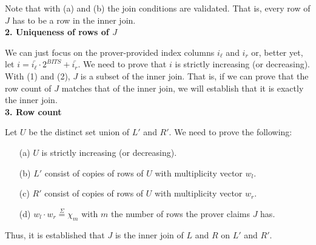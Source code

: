 \documentclass[11pt]{article}
\begin{document}
\noindent Note that with (a) and (b) the join conditions are validated. That is, every row of $J$ has to be a row in the inner join.\\

\textbf{2. Uniqueness of rows of $J$}

We can just focus on the prover-provided index columns $i_\ell$ and $i_r$ or, better yet, let $i = \bar{i_\ell} \cdot 2^{BITS} + \bar{i_r}$. We need to prove that $i$ is strictly increasing (or decreasing).\\
\noindent With (1) and (2), $J$ is a subset of the inner join. That is, if we can prove that the row count of $J$ matches that of the inner join, we will establish that it is exactly the inner join.\\

\textbf{3. Row count}

Let $U$ be the distinct set union of $L'$ and $R'$. We need to prove the following:\\
\begin{enumerate}
\item[(a)] $U$ is strictly increasing (or decreasing).
\item[(b)] $L'$ consist of copies of rows of $U$ with multiplicity vector $w_l$.
\item[(c)] $R'$ consist of copies of rows of $U$ with multiplicity vector $w_r$.
\item[(d)] $w_l \cdot w_r \overset{\Sigma}{=} \chi_m$ with $m$ the number of rows the prover claims $J$ has.
\end{enumerate}

Thus, it is established that $J$ is the inner join of $L$ and $R$ on $L'$ and $R'$.\\
\end{document}
